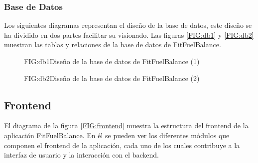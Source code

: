 \subsubsection{Base de Datos}

Los siguientes diagramas representan el diseño de la base de datos, este diseño se ha dividido en dos partes facilitar su visionado. Las figuras \ref{FIG:db1} y \ref{FIG:db2} muestran las tablas y relaciones de la base de datos de FitFuelBalance.

\begin{figure}[Diseño de la base de datos (1)]{FIG:db1}{Diseño de la base de datos de FitFuelBalance (1)}
\end{figure}

\newpage

\begin{figure}[Diseño de la base de datos (2)]{FIG:db2}{Diseño de la base de datos de FitFuelBalance (2)}
\end{figure}
\subsection{Frontend}

El diagrama de la figura \ref{FIG:frontend} muestra la estructura del frontend de la aplicación FitFuelBalance. En él se pueden ver los diferentes módulos que componen el frontend de la aplicación, cada uno de los cuales contribuye a la interfaz de usuario y la interacción con el backend.

